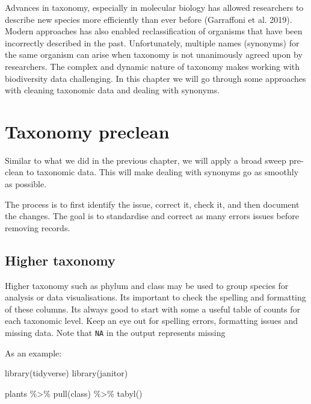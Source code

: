 \documentclass[
  letterpaper,
  DIV=11,
  numbers=noendperiod,
  oneside]{scrreprt}
\newenvironment{Shaded}{\begin{snugshade}}{\end{snugshade}}
\newcommand{\FunctionTok}[1]{\textcolor[rgb]{0.28,0.35,0.67}{#1}}
\newcommand{\NormalTok}[1]{\textcolor[rgb]{0.00,0.23,0.31}{#1}}
\newcommand{\SpecialCharTok}[1]{\textcolor[rgb]{0.37,0.37,0.37}{#1}}
\begin{document}
Advances in taxonomy, especially in molecular biology has allowed
researchers to describe new species more efficiently than ever before
(Garraffoni et al. 2019). Modern approaches has also enabled
reclassification of organisms that have been incorrectly described in
the past. Unfortunately, multiple names (synonyms) for the same organism
can arise when taxonomy is not unanimously agreed upon by researchers.
The complex and dynamic nature of taxonomy makes working with
biodiversity data challenging. In this chapter we will go through some
approaches with cleaning taxonomic data and dealing with synonyms.

\hypertarget{taxonomy-preclean}{%
\section{Taxonomy preclean}\label{taxonomy-preclean}}

Similar to what we did in the previous chapter, we will apply a broad
sweep pre-clean to taxonomic data. This will make dealing with synonyms
go as smoothly as possible.

The process is to first identify the issue, correct it, check it, and
then document the changes. The goal is to standardise and correct as
many errors issues before removing records.

\hypertarget{higher-taxonomy}{%
\subsection{Higher taxonomy}\label{higher-taxonomy}}

Higher taxonomy such as phylum and class may be used to group species
for analysis or data visualisations. Its important to check the spelling
and formatting of these columns. Its always good to start with some a
useful table of counts for each taxonomic level. Keep an eye out for
spelling errors, formatting issues and missing data. Note that
\texttt{NA} in the output represents missing

As an example:

\begin{Shaded}
\begin{Highlighting}[]
\FunctionTok{library}\NormalTok{(tidyverse)}
\FunctionTok{library}\NormalTok{(janitor)}

\NormalTok{plants }\SpecialCharTok{\%\textgreater{}\%} 
  \FunctionTok{pull}\NormalTok{(class) }\SpecialCharTok{\%\textgreater{}\%} 
  \FunctionTok{tabyl}\NormalTok{()}
\end{Highlighting}
\end{Shaded}
\end{document}
